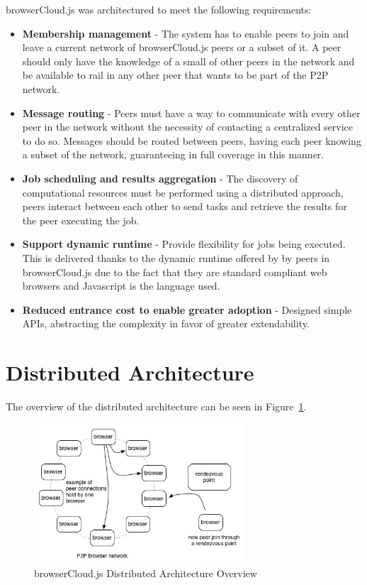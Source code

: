 browserCloud.js was architectured to meet the following requirements:

\begin{itemize}
    \item \textbf{Membership management} - The system has to enable peers to join and leave a current network of browserCloud.js peers or a subset of it. A peer should only have the knowledge of a small of other peers in the network and be available to rail in any other peer that wants to be part of the P2P network.
    \item \textbf{Message routing} - Peers must have a way to communicate with every other peer in the network without the necessity of contacting a centralized service to do so. Messages should be routed between peers, having each peer knowing a subset of the network, guaranteeing in full coverage in this manner.
    \item \textbf{Job scheduling and results aggregation} - The discovery of computational resources must be performed using a distributed approach, peers interact between each other to send tasks and retrieve the results for the peer executing the job.
    \item \textbf{Support dynamic runtime} - Provide flexibility for jobs being executed. This is delivered thanks to the dynamic runtime offered by by peers in browserCloud.js due to the fact that they are standard compliant web browsers and Javascript is the language used.
    \item \textbf{Reduced entrance cost to enable greater adoption} - Designed simple APIs, abstracting the complexity in favor of greater extendability.
\end{itemize}

\section{Distributed Architecture}

The overview of the distributed architecture can be seen in Figure~\ref{fig:n-a-o}.

\begin{figure}[h!]
  \centering
  \includegraphics[width=0.7\textwidth]{figs/network-architecture-overview}
  \caption{browserCloud.js Distributed Architecture Overview}
  \label{fig:n-a-o}
\end{figure}

